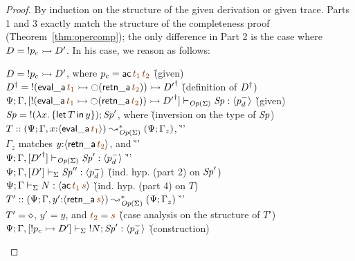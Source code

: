 \begin{proof}
By induction on the structure of the given derivation or given trace. Parts 
1 and 3 exactly match the structure of the completeness proof 
(Theorem~\ref{thm:opercomp}); the only difference in Part 2 is the case
where $D = {!}p_c \rightarrowtail D'$. In his case, we reason as follows:

\begin{tabbing}
$D = {!}p_c \rightarrowtail D'$, where $p_c = {\sf ac}\,\lf{t_1}\,\lf{t_2}$
 \` (given)
\\
$\opsubst{D} = {!}({\sf eval\_a}\,\lf{t_1}
\lefti {\ocircle}({\sf retn\_a}\,\lf{t_2})) \lefti \opsubst{D'}$
 \` (definition of ${{D}^\dag}$)
\\
$\slst{\transop{\Sigma}}{\Psi}{\Gamma, [{!}({\sf eval\_a}\,\lf{t_1}
\lefti {\ocircle}({\sf retn\_a}\,\lf{t_2})) \lefti \opsubst{D'}]}{\Sp}{\susp{p^-_d}}$
 \` (given)
\\
${\it Sp} = {!}{(\lambda x.\,\{{\sf let}\,{T}\,{\sf in}\, {y} \})}; {\it Sp}'$, where
 \` (inversion on the type of ${\it Sp}$)
\\
\qquad $T :: (\Psi; \Gamma, x{:}\susp{{\sf eval\_a}\,\lf{t_1}}) \leadsto^*_{\transop{\Sigma}} (\Psi; \Gamma_z)$,
 \` ''\qquad\qquad~
\\
\qquad $\Gamma_z$ matches $y{:}\susp{{\sf retn\_a}\,\lf{t_2}}$, and
 \` ''\qquad\qquad~
\\
\qquad ${\Psi}; {\Gamma, [{{D'}^\dag}]} \vdash_{{\it Op}({\Sigma})} {{\it Sp}'} : {\langle {p^-_d} \rangle}$
 \` ''\qquad\qquad~
\\
${\Psi}; {\Gamma, [{D'}]} \vdash_{{\Sigma}} {{\it Sp}''} : {\langle {p^-_d} \rangle}$
 \` (ind. hyp. (part 2) on ${\it Sp}'$)
\\
$\slst{\Sigma}{\Psi}{\Gamma}{N}{\susp{{\sf ac}\,\lf{t_1}\,\lf{s}}}$
 \` (ind. hyp. (part 4) on $T$)
\\
$T' :: (\Psi; \Gamma, y'{:}\susp{{\sf retn\_a}\,\lf{s}})
         \leadsto^*_{\transop{\Sigma}}
       (\Psi; \Gamma_z)$
 \` ''\qquad\qquad~
\\
$T' = \diamond$, $y' = y$, and $\lf{t_2} = \lf{s}$
 \` (case analysis on the structure of $T'$)
\\
${\Psi}; {\Gamma, [{!}p_c \rightarrowtail D']} \vdash_{\Sigma} {{!}{N}; {{\it Sp}'}} : {\langle {p^-_d} \rangle}$
 \` (construction)
\end{tabbing}


\end{proof}
